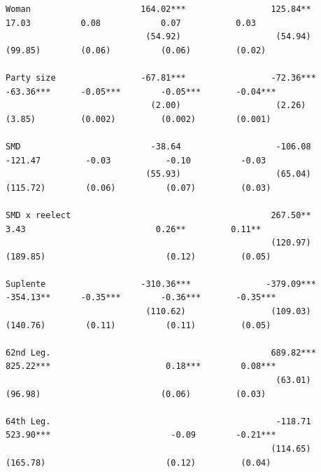 \documentclass[letter,12pt]{article}
\begin{document}
\begin{table}
\begin{tiny}
\begin{verbatim}
Woman                      164.02***                 125.84**              17.03          0.08            0.07           0.03     
                            (54.92)                   (54.94)             (99.85)        (0.06)          (0.06)         (0.02)    
                                                                                                                                  
Party size                 -67.81***                 -72.36***           -63.36***      -0.05***        -0.05***       -0.04***   
                             (2.00)                   (2.26)              (3.85)         (0.002)         (0.002)        (0.001)   
                                                                                                                                  
SMD                          -38.64                   -106.08             -121.47         -0.03           -0.10          -0.03    
                            (55.93)                   (65.04)            (115.72)        (0.06)          (0.07)         (0.03)    
                                                                                                                                  
SMD x reelect                                        267.50**              3.43                          0.26**         0.11**    
                                                     (120.97)            (189.85)                        (0.12)         (0.05)    
                                                                                                                                  
Suplente                   -310.36***               -379.09***           -354.13**      -0.35***        -0.36***       -0.35***   
                            (110.62)                 (109.03)            (140.76)        (0.11)          (0.11)         (0.05)    
                                                                                                                                  
62nd Leg.                                            689.82***           825.22***                       0.18***        0.08***   
                                                      (63.01)             (96.98)                        (0.06)         (0.03)    
                                                                                                                                  
64th Leg.                                             -118.71            523.90***                        -0.09        -0.21***   
                                                     (114.65)            (165.78)                        (0.12)         (0.04)    
                                                                                                                                  

\end{verbatim}
\end{tiny}
\end{table}
\end{document}
